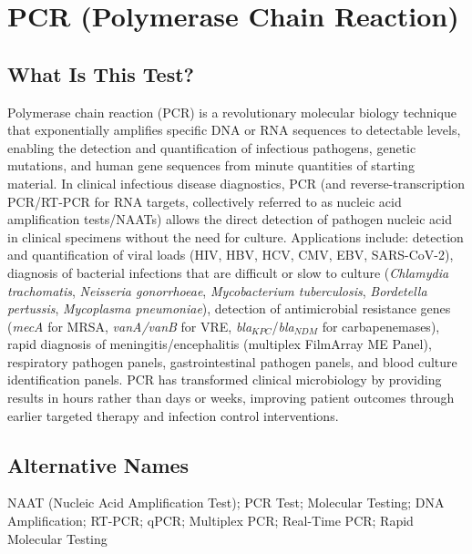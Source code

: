 \chapter{PCR (Polymerase Chain Reaction)}

\section*{What Is This Test?}
Polymerase chain reaction (PCR) is a revolutionary molecular biology technique that exponentially amplifies specific DNA or RNA sequences to detectable levels, enabling the detection and quantification of infectious pathogens, genetic mutations, and human gene sequences from minute quantities of starting material. In clinical infectious disease diagnostics, PCR (and reverse-transcription PCR/RT-PCR for RNA targets, collectively referred to as nucleic acid amplification tests/NAATs) allows the direct detection of pathogen nucleic acid in clinical specimens without the need for culture. Applications include: detection and quantification of viral loads (HIV, HBV, HCV, CMV, EBV, SARS-CoV-2), diagnosis of bacterial infections that are difficult or slow to culture (\textit{Chlamydia trachomatis}, \textit{Neisseria gonorrhoeae}, \textit{Mycobacterium tuberculosis}, \textit{Bordetella pertussis}, \textit{Mycoplasma pneumoniae}), detection of antimicrobial resistance genes (\textit{mecA} for MRSA, \textit{vanA/vanB} for VRE, \textit{bla}$_{KPC}$/\textit{bla}$_{NDM}$ for carbapenemases), rapid diagnosis of meningitis/encephalitis (multiplex FilmArray ME Panel), respiratory pathogen panels, gastrointestinal pathogen panels, and blood culture identification panels. PCR has transformed clinical microbiology by providing results in hours rather than days or weeks, improving patient outcomes through earlier targeted therapy and infection control interventions.

\section*{Alternative Names}
NAAT (Nucleic Acid Amplification Test); PCR Test; Molecular Testing; DNA Amplification; RT-PCR; qPCR; Multiplex PCR; Real-Time PCR; Rapid Molecular Testing

